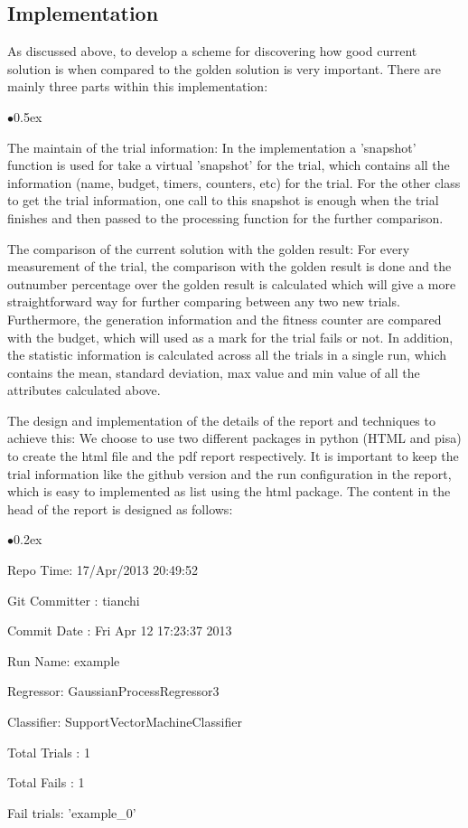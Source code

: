 \documentclass[12pt, runningheads,a4paper]{llncs}
\begin{document}
\subsection{Implementation}
As discussed above, to develop a scheme for discovering how good current solution is when compared to the golden solution is very important. There are mainly three parts within this implementation:
\begin{list}{$\bullet$}{\itemsep 0.5ex}
\item The maintain of the trial information: In the implementation a 'snapshot' function is used for take a virtual 'snapshot' for the trial, which contains all the information (name, budget, timers, counters, etc) for the trial. For the other class to get the trial information, one call to this snapshot is enough when the trial finishes and then passed to the processing function for the further comparison.
\item The comparison of the current solution with the golden result: For every measurement of the trial, the comparison with the golden result is done and the outnumber percentage over the golden result is calculated which will give a more straightforward way for further comparing between any two new trials. Furthermore, the generation information and the fitness counter are compared with the budget, which will used as a mark for the trial fails or not. In addition, the statistic information is calculated across all the trials in a single run, which contains the mean, standard deviation, max value and min value of all the attributes calculated above. 
\item The design and implementation of the details of the report and techniques to achieve this: We choose to use two different packages in python (HTML and pisa) to create the html file and the pdf report respectively. It is important to keep the trial information like the github version and the run configuration in the report, which is easy to implemented as list using the html package. The content in the head of the report is designed as follows:
\begin{list}{$\bullet$}{\itemsep 0.2ex}
\item Repo Time: 17/Apr/2013 20:49:52
\item Git Committer : tianchi
\item Commit Date : Fri Apr 12 17:23:37 2013
\item Run Name: example
\item Regressor: GaussianProcessRegressor3
\item Classifier: SupportVectorMachineClassifier
\item Total Trials : 1
\item Total Fails : 1
\item Fail trials: 'example\_0'
\end{list}
\end{list}
\end{document}
